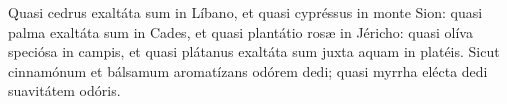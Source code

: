 \tuAutem


\vfill \pagebreak






Quasi cedrus exaltáta sum in Líbano, et quasi cypréssus in monte Sion:
quasi palma exaltáta sum in Cades, et quasi plantátio rosæ in Jéricho:
quasi olíva speciósa in campis, et quasi plátanus exaltáta sum juxta aquam
in platéis.
Sicut cinnamónum et bálsamum aromatízans odórem dedi; 
quasi myrrha elécta dedi suavitátem odóris.

\tuAutem
